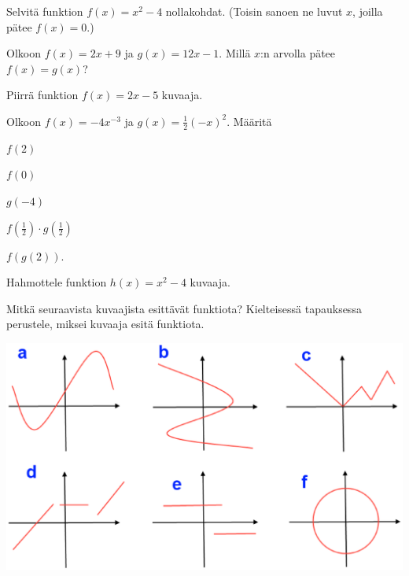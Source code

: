\begin{tehtava}
Selvitä funktion $f(x) = x^2 - 4$ nollakohdat. (Toisin sanoen ne luvut $x$, joilla pätee $f(x)=0$.)
\end{tehtava}

\begin{tehtava}
Olkoon $f(x)=2x+9$ ja $g(x)=12x-1$. Millä $x$:n arvolla pätee $f(x)=g(x)$?
\end{tehtava}

\begin{tehtava}
Piirrä funktion $f(x) = 2x-5$ kuvaaja.
\end{tehtava}

\begin{tehtava}
Olkoon $f(x)=-4x^{-3}$ ja $ \displaystyle g(x)=\frac{1}{2}(-x)^{2}$. Määritä
\begin{kohdat}
\item \(f(2)\)
\item \(f(0)\)
\item \(g(-4)\)
\item \(\displaystyle f\left(\frac{1}{2}\right)\cdot g\left(\frac{1}{2}\right)\)
\item \(\displaystyle f\left(g(2)\right).\)
\end{kohdat}
\end{tehtava}

\begin{tehtava}
Hahmottele funktion $h(x) = x^2 -4$ kuvaaja.
\end{tehtava}

\begin{tehtava}
Mitkä seuraavista kuvaajista esittävät funktiota? Kielteisessä tapauksessa perustele, miksei kuvaaja esitä funktiota.\begin{center}\includegraphics{figs/kuvaajia.eps}\end{center}
\end{tehtava}


